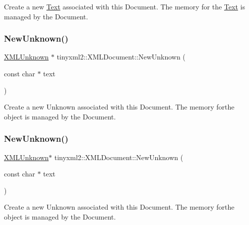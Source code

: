 Create a new \hyperlink{classText}{Text} associated with this Document. The memory for the \hyperlink{classText}{Text} is managed by the Document. \mbox{\label{classtinyxml2_1_1XMLDocument_a4954f502c5fd7f49de54c3c0c99bb73d}} 
\subsubsection{\texorpdfstring{New\+Unknown()}{NewUnknown()}\hspace{0.1cm}{\footnotesize\ttfamily [1/2]}}
{\footnotesize\ttfamily \hyperlink{classtinyxml2_1_1XMLUnknown}{X\+M\+L\+Unknown} $\ast$ tinyxml2\+::\+X\+M\+L\+Document\+::\+New\+Unknown (\begin{DoxyParamCaption}\item[{const char $\ast$}]{text }\end{DoxyParamCaption})}

Create a new Unknown associated with this Document. The memory forthe object is managed by the Document. \mbox{\label{classtinyxml2_1_1XMLDocument_a5385c937734ff6db9226ab707d2c7147}} 
\subsubsection{\texorpdfstring{New\+Unknown()}{NewUnknown()}\hspace{0.1cm}{\footnotesize\ttfamily [2/2]}}
{\footnotesize\ttfamily \hyperlink{classtinyxml2_1_1XMLUnknown}{X\+M\+L\+Unknown}$\ast$ tinyxml2\+::\+X\+M\+L\+Document\+::\+New\+Unknown (\begin{DoxyParamCaption}\item[{const char $\ast$}]{text }\end{DoxyParamCaption})}

Create a new Unknown associated with this Document. The memory forthe object is managed by the Document. \mbox{\label{classtinyxml2_1_1XMLDocument_a1819bd34f540a7304c105a6232d25a1f}} 
